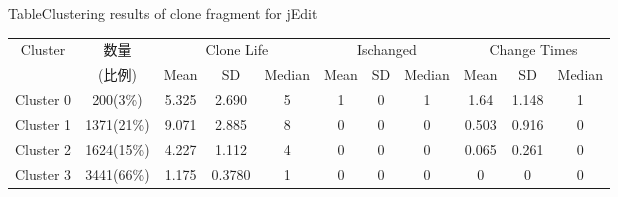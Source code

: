 \begin{table}[htbp]
{Table$\!$}{Clustering results of clone fragment for jEdit}
\vspace{0.5em}
\centering
\footnotesize
\begin{tabular}{ccccccccccc}
\toprule[1.5pt]
\multirow{2}{*}{Cluster}&{数量}&\multicolumn{3}{c}{Clone Life}&\multicolumn{3}{c}{Ischanged}&\multicolumn{3}{c}{Change Times} \\
\cline{3-11}
&(比例)&{Mean}&SD &{Median}&{Mean}&SD&{Median}&{Mean}&SD &{Median}\\
\midrule[1pt]
Cluster 0&200(3\%)&5.325&2.690&5&1	&0	&1	&1.64	&1.148&1\\ 
Cluster 1&1371(21\%)	&9.071&2.885&8	&0	&0	&0	&0.503&0.916&0\\ 
Cluster 2&	1624(15\%)	&4.227&1.112&4	&0	&0	&0	&0.065&0.261&0\\ 
Cluster 3&	3441(66\%)	&1.175	&0.3780&1	&0	&0	&0	&0	&0	&0\\ 
\bottomrule[1.5pt]
\end{tabular}
\end{table}


